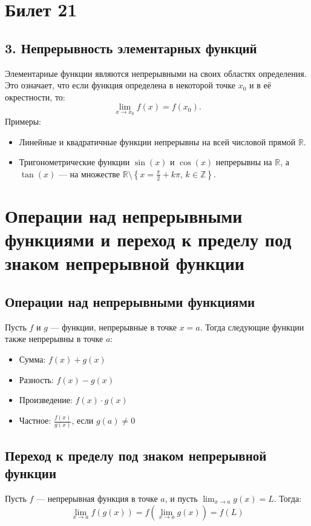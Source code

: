 \documentclass{article}
\begin{document}
\section{Билет 21}

\subsection*{3. Непрерывность элементарных функций}
Элементарные функции являются непрерывными на своих областях определения. Это означает, что если функция определена в некоторой точке $x_0$ и в её окрестности, то:
\[
\lim_{x \to x_0} f(x) = f(x_0).
\]
Примеры:
\begin{itemize}
    \item Линейные и квадратичные функции непрерывны на всей числовой прямой $\mathbb{R}$.
    \item Тригонометрические функции $\sin(x)$ и $\cos(x)$ непрерывны на $\mathbb{R}$, а $\tan(x)$ — на множестве $\mathbb{R} \setminus \left\{x = \frac{\pi}{2} + k\pi, \, k \in \mathbb{Z}\right\}$.
\end{itemize}

\section*{Операции над непрерывными функциями и переход к пределу под знаком непрерывной функции}

\subsection*{Операции над непрерывными функциями}
Пусть $f$ и $g$ — функции, непрерывные в точке $x = a$. Тогда следующие функции также непрерывны в точке $a$:
\begin{itemize}
    \item Сумма: $f(x) + g(x)$
    \item Разность: $f(x) - g(x)$
    \item Произведение: $f(x) \cdot g(x)$
    \item Частное: $\frac{f(x)}{g(x)}$, если $g(a) \neq 0$
\end{itemize}

\subsection*{Переход к пределу под знаком непрерывной функции}
Пусть $f$ — непрерывная функция в точке $a$, и пусть $\lim_{x \to a} g(x) = L$. Тогда:
\[
\lim_{x \to a} f(g(x)) = f\left(\lim_{x \to a} g(x)\right) = f(L)
\]
\end{document}
